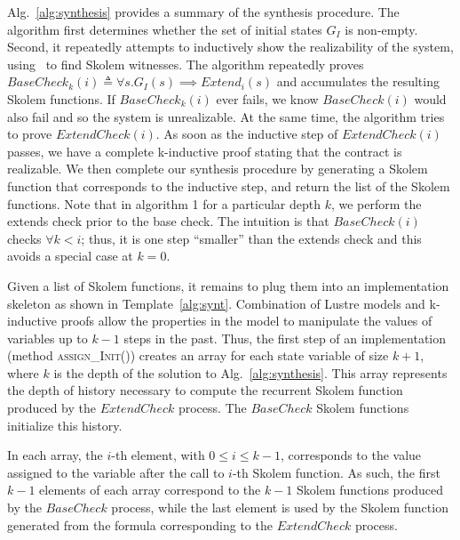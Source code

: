 Alg.~\ref{alg:synthesis} provides a summary of the synthesis
procedure. The algorithm first determines whether the set of initial states $G_I$ is non-empty.
Second, it repeatedly attempts to inductively show the realizability of the system, using
\aeval\ to find Skolem witnesses.  The algorithm
repeatedly proves $\mathit{BaseCheck_k(i)}
\triangleq \forall s. G_I(s) \implies \mathit{Extend}_i(s)$ and
accumulates the resulting Skolem functions. If
$\mathit{BaseCheck_k(i)}$ ever fails, we know $\mathit{BaseCheck(i)}$
would also fail and so the system is unrealizable. At the same time,
the algorithm tries to prove $\mathit{ExtendCheck(i)}$. As soon as the
inductive step of $\mathit{ExtendCheck(i)}$ passes, we have a complete
k-inductive proof stating that the contract is realizable. We then
complete our synthesis procedure by generating a Skolem function that
corresponds to the inductive step, and return the list of the Skolem
functions.  Note that in algorithm 1 for a particular depth $k$,
we perform the extends check prior to the base check.
The intuition is that $\mathit{BaseCheck(i)}$ checks
$\forall k < i$; thus, it is one step ``smaller'' than the extends
check and this avoids a special case at $k=0$.

Given a list of Skolem functions, it remains to plug them into
an implementation skeleton as shown in Template~\ref{alg:synt}.
Combination of Lustre models and k-inductive proofs
allow the properties in the model to manipulate the
 values of variables up to $k-1$ steps in the past. Thus,
the first step of an implementation  (method \textsc{assign\_Init()})
 creates an array for each state variable of size $k+1$, where
$k$ is the depth of the solution to Alg.~\ref{alg:synthesis}.
This array represents the depth of history necessary to compute 
the recurrent Skolem function produced by the $\mathit{ExtendCheck}$ process.
The $\mathit{BaseCheck}$ Skolem functions initialize this history.

In each array, the $i$-th element, with $0\leq i \leq k-1$,
corresponds to the value assigned to the variable after the call to
$i$-th Skolem function. As such, the first $k-1$ elements of each array
correspond to the $k-1$ Skolem functions produced by the
$\mathit{BaseCheck}$ process, while the last element is used by the
Skolem function generated from the formula corresponding to the
$\mathit{ExtendCheck}$ process. 

